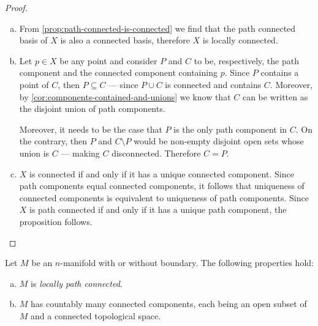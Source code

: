 \begin{proof}
\begin{enumerate}[(a)]\setlength\itemsep{0em}
\item From \cref{prop:path-connected-is-connected} we find that the path
  connected basis of \(X\) is also a connected basis, therefore \(X\) is locally connected.

\item Let \(p \in X\) be any point and consider \(P\) and \(C\) to be,
  respectively, the path component and the connected component containing
  \(p\). Since \(P\) contains a point of \(C\), then \(P \subseteq C\) --- since
  \(P \cup C\) is connected and contains \(C\). Moreover, by
  \cref{cor:components-contained-and-unions} we know that \(C\) can be written
  as the disjoint union of path components.

  Moreover, it needs to be the case that \(P\) is the only path component in
  \(C\). On the contrary, then \(P\) and \(C \setminus P\) would be non-empty
  disjoint open sets whose union is \(C\) --- making \(C\)
  disconnected. Therefore \(C = P\).

\item \(X\) is connected if and only if it has a unique connected
  component. Since path components equal connected components, it follows that
  uniqueness of connected components is equivalent to uniqueness of path
  components. Since \(X\) is path connected if and only if it has a unique path
  component, the proposition follows.
\end{enumerate}
\end{proof}

\begin{proposition}
\label{prop:connectivity-manifolds}
Let \(M\) be an \(n\)-manifold with or without boundary. The following
properties hold:
\begin{enumerate}[(a)]\setlength\itemsep{0em}
\item \(M\) is \emph{locally path connected}.

\item \(M\) has countably many connected components, each being an open subset
  of \(M\) and a connected topological space.
\end{enumerate}
\end{proposition}

